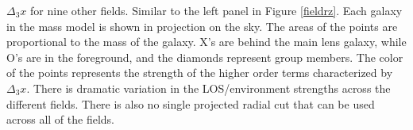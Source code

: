 \label{allfields} $\Delta_3x$ for nine other fields. Similar to the left panel in Figure \ref{fieldrz}. Each galaxy in the mass model is shown in projection on the sky. The areas of the points are proportional to the mass of the galaxy. X's are behind the main lens galaxy, while O's are in the foreground, and the diamonds represent group members. The color of the points represents the strength of the higher order terms characterized by $\Delta_3 x$. There is dramatic variation in the LOS/environment strengths across the different fields. There is also no single projected radial cut that can be used across all of the fields.